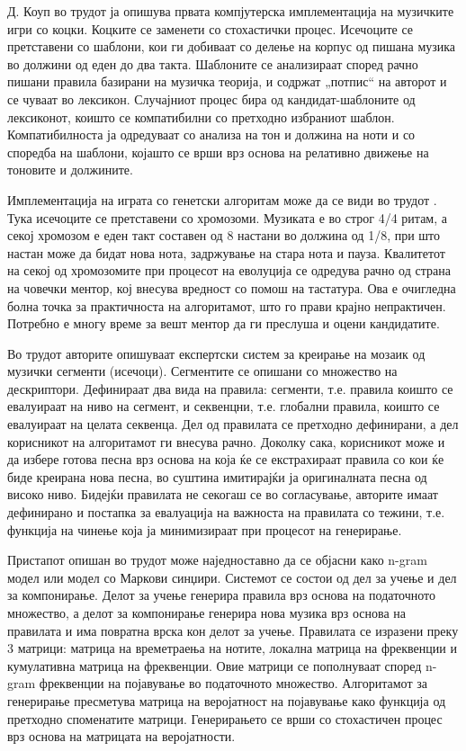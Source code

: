 Д. Коуп во трудот \cite{Cope1991} ја опишува првата компјутерска имплементација на музичките игри со коцки. Коцките се заменети со стохастички процес. Исечоците се претставени со шаблони, кои ги добиваат со делење на корпус од пишана музика во должини од еден до два такта. Шаблоните се анализираат според рачно пишани правила базирани на музичка теорија, и содржат „потпис“ на авторот и се чуваат во лексикон. Случајниот процес бира од кандидат-шаблоните од лексиконот, коишто се компатибилни со претходно избраниот шаблон. Компатибилноста ја одредуваат со анализа на тон и должина на ноти и со споредба на шаблони, којашто се врши врз основа на релативно движење на тоновите и должините.

Имплементација на играта со генетски алгоритам може да се види во трудот \cite{Biles1994}. Тука исечоците се претставени со хромозоми. Музиката е во строг 4/4 ритам, а секој хромозом е еден такт составен од 8 настани во должина од 1/8, при што настан може да бидат нова нота, задржување на стара нота и пауза. Квалитетот на секој од хромозомите при процесот на еволуција се одредува рачно од страна на човечки ментор, кој внесува вредност со помош на тастатура. Ова е очигледна болна точка за практичноста на алгоритамот, што го прави крајно непрактичен. Потребно е многу време за вешт ментор да ги преслуша и оцени кандидатите. 

Во трудот \cite{Zils2001} авторите опишуваат експертски систем за креирање на мозаик од музички сегменти (исечоци). Сегментите се опишани со множество на дескриптори. Дефинираат два вида на правила: сегменти, т.е. правила коишто се евалуираат на ниво на сегмент, и секвенцни, т.е. глобални правила, коишто се евалуираат на целата секвенца. Дел од правилата се претходно дефинирани, а дел корисникот на алгоритамот ги внесува рачно. Доколку сака, корисникот може и да избере готова песна врз основа на која ќе се екстрахираат правила со кои ќе биде креирана нова песна, во суштина имитирајќи ја оригиналната песна од високо ниво. Бидејќи правилата не секогаш се во согласување, авторите имаат дефинирано и постапка за евалуација на важноста на правилата со тежини, т.е. функција на чинење која ја минимизираат при процесот на генерирање.

Пристапот опишан во трудот \cite{GarciaSalas2011} може наједноставно да се објасни како n-gram модел или модел со Маркови синџири. Системот се состои од дел за учење и дел за компонирање. Делот за учење генерира правила врз основа на податочното множество, а делот за компонирање генерира нова музика врз основа на правилата и има повратна врска кон делот за учење. Правилата се изразени преку 3 матрици: матрица на времетраења на нотите, локална матрица на фреквенции и кумулативна матрица на фреквенции. Овие матрици се пополнуваат според n-gram фреквенции на појавување во податочното множество. Алгоритамот за генерирање пресметува матрица на веројатност на појавување како функција од претходно споменатите матрици. Генерирањето се врши со стохастичен процес врз основа на матрицата на веројатности. 

